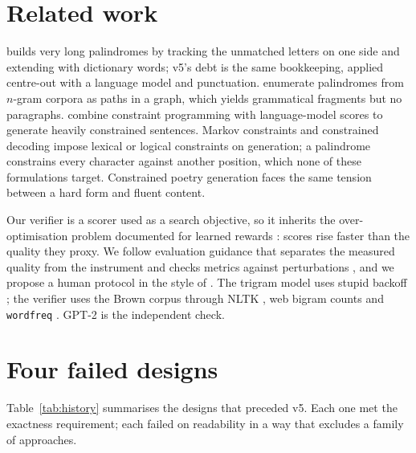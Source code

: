 \documentclass[11pt]{article}
\newcommand{\code}[1]{\texttt{#1}}
\begin{document}
\section{Related work}

\citet{norvig2002palindrome} builds very long palindromes by tracking the unmatched letters on one side and extending with dictionary words; v5's debt is the same bookkeeping, applied centre-out with a language model and punctuation. \citet{papadopoulos2015palindromes} enumerate palindromes from $n$-gram corpora as paths in a graph, which yields grammatical fragments but no paragraphs. \citet{bonlarron-regin-2024} combine constraint programming with language-model scores to generate heavily constrained sentences. Markov constraints \citep{pachet-roy-2011-markov} and constrained decoding \citep{hokamp-liu-2017-lexically,lu-etal-2021-neurologic} impose lexical or logical constraints on generation; a palindrome constrains every character against another position, which none of these formulations target. Constrained poetry generation \citep{ghazvininejad-etal-2016-generating} faces the same tension between a hard form and fluent content.

Our verifier is a scorer used as a search objective, so it inherits the over-optimisation problem documented for learned rewards \citep{gao-etal-2023-scaling}: scores rise faster than the quality they proxy. We follow evaluation guidance that separates the measured quality from the instrument \citep{howcroft-etal-2020-twenty} and checks metrics against perturbations \citep{sai-etal-2021-perturbation}, and we propose a human protocol in the style of \citet{khashabi-etal-2022-genie}. The trigram model uses stupid backoff \citep{brants-etal-2007-large}; the verifier uses the Brown corpus \citep{kucera-francis-1967} through NLTK \citep{loper-bird-2002-nltk}, web bigram counts \citep{norvig-2009-ngrams} and \code{wordfreq} \citep{speer-2022-wordfreq}. GPT-2 \citep{radford2019language} is the independent check.

\section{Four failed designs}\label{sec:history}

Table~\ref{tab:history} summarises the designs that preceded v5. Each one met the exactness requirement; each failed on readability in a way that excludes a family of approaches.
\end{document}
